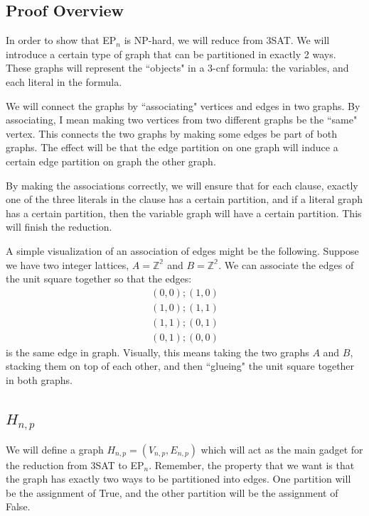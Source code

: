 \documentclass[runningheads,a4paper]{llncs}
\begin{document}
\subsection{Proof Overview}

In order to show that EP$_n$ is NP-hard, we will reduce from 3SAT. We will introduce a certain type of graph that can be partitioned in exactly 2 ways. These graphs will represent the ``objects" in a 3-cnf formula: the variables, and each literal in the formula. 

We will connect the graphs by ``associating" vertices and edges in two graphs. By associating, I mean making two vertices from two different graphs be the ``same" vertex. This connects the two graphs by making some edges be part of both graphs. The effect will be that the edge partition on one graph will induce a certain edge partition on graph the other graph. 

By making the associations correctly, we will ensure that for each clause, exactly one of the three literals in the clause has a certain partition, and if a literal graph has a certain partition, then the variable graph will have a certain partition. This will finish the reduction. 

A simple visualization of an association of edges might be the following. Suppose we have two integer lattices, $A = \mathbb{Z^2}$ and $B = \mathbb{Z^2}$. We can associate the edges of the unit square together so that the edges: 
\[ \begin{array}{c} (0,0);(1,0) \\
			     (1, 0); (1, 1) \\
			     (1, 1); (0, 1) \\
			     (0, 1); (0,0) \end{array} \]
  is the same edge in graph. Visually, this means taking the two graphs $A$ and $B$, stacking them on top of each other, and then ``glueing" the unit square together in both graphs. 

\subsection{$H_{n,p}$}

We will define a graph $H_{n,p} = (V_{n,p}, E_{n,p})$ which will act as the main gadget for the reduction from 3SAT to EP$_{n}$. Remember, the property that we want is that the graph has exactly two ways to be partitioned into edges. One partition will be the assignment of True, and the other partition will be the assignment of False. 
\end{document}
